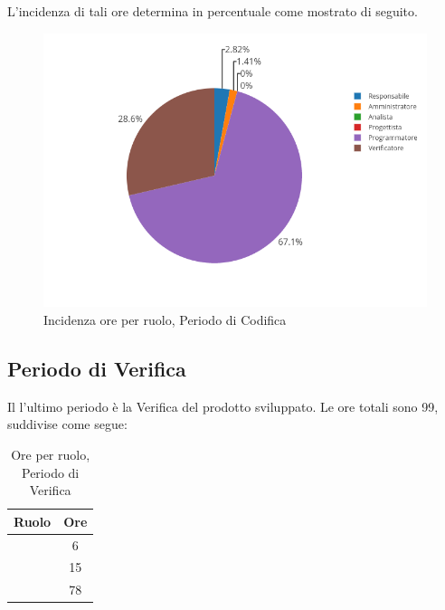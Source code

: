 L'incidenza di tali ore determina in percentuale come mostrato di seguito.
\begin{figure}[H]
	\centering
	\includegraphics[scale=0.6]{img/Codifica.png}
	\caption{Incidenza ore per ruolo, Periodo di Codifica}
\end{figure}

\subsection{Periodo di Verifica}
Il l'ultimo periodo è la Verifica del prodotto sviluppato. Le ore totali sono 99, suddivise come segue:

\begin{table}[H]
	\begin{center}
		\begin{tabular}{|c|c|}
			\hline
			\textbf{Ruolo}	& \textbf{Ore} \\
			\hline
			\Res	&	6	\\
			\hline
			\Prog   &	15	\\
			\hline
			\Ver	&	78	\\
			\hline
		\end{tabular}
	\end{center}
	\caption{Ore per ruolo, Periodo di Verifica}
\end{table}

